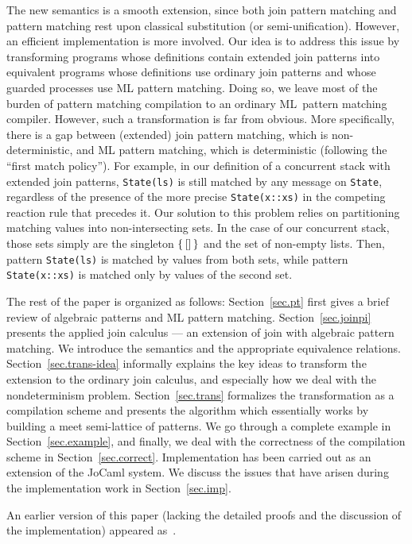 \documentclass{LMCS}
\let \lst \lstinline
\newcommand{\jocaml}{\textrm{JoCaml}\xspace}
\renewcommand{\_}{\mathord{\rule[-.25ex]{1ex}{.15ex}}}
\begin{document}
The new semantics is a smooth extension, since both join pattern
matching and pattern matching rest upon classical substitution (or
semi-unification).  However, an efficient implementation is more
involved. Our idea is to address this issue by transforming programs
whose definitions contain extended join patterns into equivalent
programs whose definitions use ordinary join patterns and whose
guarded processes use ML pattern matching. Doing so, we leave most of
the burden of pattern matching compilation to an ordinary ML~pattern
matching compiler. However, such a transformation is far from obvious.
More specifically, there is a gap between (extended) join pattern
matching, which is non-deterministic, and ML pattern matching, which
is deterministic (following the ``first match policy''). For example,
in our definition of a concurrent stack with extended join patterns,
\lst"State(ls)" is still matched by any message on \lst"State",
regardless of the presence of the more precise \lst"State(x::xs)" in
the competing reaction rule that precedes it.  Our solution to this
problem relies on partitioning matching values into non-intersecting
sets.  In the case of our concurrent stack, those sets simply are the
singleton $\{\lst"[]"\}$ and the set of non-empty lists.  Then,
pattern \lst"State(ls)" is matched by values from both sets, while
pattern \lst"State(x::xs)" is matched only by values of the second
set.

The rest of the paper is organized as follows: Section~\ref{sec.pt}
first gives a brief review of algebraic patterns and ML pattern
matching. Section~\ref{sec.joinpi} presents the applied join calculus
--- an extension of join with algebraic pattern matching.
We introduce the semantics and the appropriate equivalence relations.
Section~\ref{sec.trans-idea} informally explains the key ideas to
transform the extension to the ordinary join calculus, and especially how
we deal with the nondeterminism problem.
Section~\ref{sec.trans} formalizes the transformation as a
compilation scheme and presents the algorithm which essentially works
by building a meet semi-lattice of patterns.  We go through a complete
example in Section~\ref{sec.example}, and finally, we deal with the
correctness of the compilation scheme in Section~\ref{sec.correct}.
Implementation has been carried out as an extension of the \jocaml system.
We discuss the issues that have arisen during the
implementation work in Section~\ref{sec.imp}.

An earlier version of this paper (lacking the detailed proofs and the
discussion of the implementation) appeared
as~\cite{MaMaranget2004pattern}.
\end{document}
